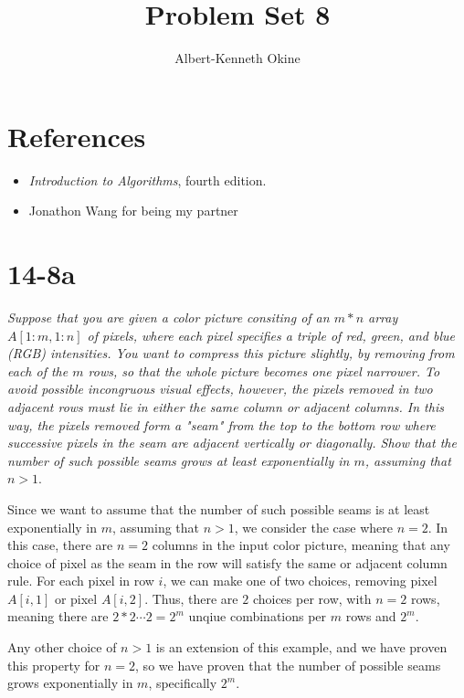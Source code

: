 \documentclass{homework}
\title{Problem Set 8}
\author{Albert-Kenneth Okine}
\begin{document}
\maketitle

\section*{References}
  \begin{itemize}
    \item \textit{Introduction to Algorithms}, fourth edition.
    \item Jonathon Wang for being my partner
  \end{itemize}

  \pagebreak

\section*{14-8a} %
\textit{Suppose that you are given a color picture consiting of an $m*n$ array
  $A[1:m, 1:n]$ of pixels, where each pixel specifies a triple of red, green,
  and blue (RGB) intensities. You want to compress this picture slightly, by
  removing from each of the $m$ rows, so that the whole picture becomes one
  pixel narrower. To avoid possible incongruous visual effects, however, the
  pixels removed in two adjacent rows must lie in either the same column or
  adjacent columns. In this way, the pixels removed form a "seam" from the
  top to the bottom row where successive pixels in the seam are adjacent
  vertically or diagonally. Show that the number of such possible seams grows
  at least exponentially in $m$, assuming that $n > 1$}.
  
  Since we want to assume that the number of such possible seams is at least
  exponentially in $m$, assuming that $n > 1$, we consider the case where
  $n = 2$. In this case, there are $n = 2$ columns in the input color picture,
  meaning that any choice of pixel as the seam in the row will satisfy the same
  or adjacent column rule. For each pixel in row $i$, we can make one of two
  choices, removing pixel $A[i,1]$ or pixel $A[i,2]$. Thus, there are $2$
  choices per row, with $n = 2$ rows, meaning there are $2 * 2 \cdots 2 = 2^m$
  unqiue combinations per $m$ rows and $2^m$.

  Any other choice of $n > 1$ is an extension of this example, and we have
  proven this property for $n = 2$, so we have proven that the number of
  possible seams grows exponentially in $m$, specifically $2^m$.
\end{document}
